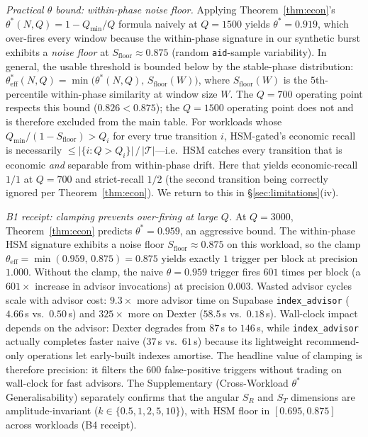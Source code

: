 \documentclass[10pt,journal,compsoc]{IEEEtran}
\newcommand{\thetastar}{\theta^{*}}
\begin{document}
\emph{Practical $\theta$ bound: within-phase noise floor.}
Applying Theorem~\ref{thm:econ}'s $\thetastar(N,Q)\!=\!1\!-\!Q_{\min}/Q$
formula naively at $Q\!=\!1500$ yields $\thetastar\!=\!0.919$, which
over-fires every window because the within-phase signature in our
synthetic burst exhibits a \emph{noise floor} at
$S_{\mathrm{floor}}\!\approx\!0.875$ (random \texttt{aid}-sample
variability).  In general, the usable threshold is bounded below by
the stable-phase distribution:
$\thetastar_{\mathrm{eff}}(N,Q)\!=\!\min\!\bigl(\thetastar(N,Q),\,
S_{\mathrm{floor}}(W)\bigr)$, where $S_{\mathrm{floor}}(W)$ is the
$5$th-percentile within-phase similarity at window size $W$.  The
$Q\!=\!700$ operating point respects this bound
($0.826\!<\!0.875$); the $Q\!=\!1500$ operating point does not and
is therefore excluded from the main table.  For workloads whose
$Q_{\min}\!/(1\!-\!S_{\mathrm{floor}})\!>\!Q_i$ for every true
transition $i$, HSM-gated's economic recall is necessarily
$\le\!\lvert\{i:Q\!>\!Q_i\}\rvert\,/\,|\mathcal{T}|$---i.e.\ HSM
catches every transition that is economic \emph{and} separable from
within-phase drift.  Here that yields economic-recall $1/1$ at
$Q\!=\!700$ and strict-recall $1/2$ (the second transition being
correctly ignored per Theorem~\ref{thm:econ}).  We return to this in
\S\ref{sec:limitations}(iv).

\emph{B1 receipt: clamping prevents over-firing at large $Q$.}
At $Q\!=\!3000$, Theorem~\ref{thm:econ} predicts $\thetastar\!=\!0.959$, an aggressive bound.
The within-phase HSM signature exhibits a noise floor $S_{\mathrm{floor}}\!\approx\!0.875$ on this workload, so the clamp $\theta_{\mathrm{eff}}\!=\!\min(0.959,\,0.875)\!=\!0.875$ yields exactly $1$ trigger per block at precision $1.000$.
Without the clamp, the naive $\theta\!=\!0.959$ trigger fires $601$ times per block (a $601\times$ increase in advisor invocations) at precision $0.003$.
Wasted advisor cycles scale with advisor cost: $9.3\times$ more advisor time on Supabase \texttt{index\_advisor} ($4.66$\,s vs.\ $0.50$\,s) and $325\times$ more on Dexter ($58.5$\,s vs.\ $0.18$\,s).
Wall-clock impact depends on the advisor: Dexter degrades from $87$\,s to $146$\,s, while \texttt{index\_advisor} actually completes faster naive ($37$\,s vs.\ $61$\,s) because its lightweight recommend-only operations let early-built indexes amortise.
The headline value of clamping is therefore precision: it filters the $600$ false-positive triggers without trading on wall-clock for fast advisors.
The Supplementary (Cross-Workload $\theta^{*}$ Generalisability) separately confirms that the angular $S_R$ and $S_T$ dimensions are amplitude-invariant ($k\!\in\!\{0.5,1,2,5,10\}$), with HSM floor in $[0.695,0.875]$ across workloads (B4 receipt).
\end{document}
